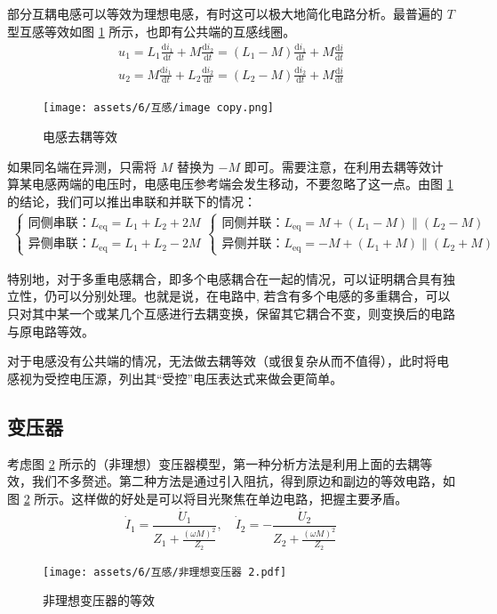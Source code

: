 \documentclass[UTF8]{report}
\theoremstyle{MyLineTheoremStyle} %
\theoremstyle{MyBlockTheoremStyle} %
\theoremstyle{MySubsubsectionStyle} %
\begin{document}
部分互耦电感可以等效为理想电感，有时这可以极大地简化电路分析。最普遍的 $T$ 型互感等效如图 \ref{电感去耦等效} 所示，也即有公共端的互感线圈。
\begin{gather}
u_1 = L_1 \frac{\mathrm{d} i_1}{\mathrm{d} t} + M \frac{\mathrm{d} i_2}{\mathrm{d} t} 
= (L_1 - M) \frac{\mathrm{d} i_1}{\mathrm{d} t} + M \frac{\mathrm{d} i}{\mathrm{d} t} \\ 
u_2 = M \frac{\mathrm{d} i_1}{\mathrm{d} t} + L_2 \frac{\mathrm{d} i_2}{\mathrm{d} t} 
= (L_2 - M) \frac{\mathrm{d} i_2}{\mathrm{d} t} + M \frac{\mathrm{d} i}{\mathrm{d} t}
\end{gather}
\begin{figure}[H]\centering
    \texttt{[image: assets/6/互感/image copy.png]}
    \caption{电感去耦等效}
    \label{电感去耦等效}
\end{figure}
如果同名端在异测，只需将 $M$ 替换为 $-M$ 即可。需要注意，在利用去耦等效计算某电感两端的电压时，电感电压参考端会发生移动，不要忽略了这一点。由图 \ref{电感去耦等效} 的结论，我们可以推出串联和并联下的情况：
\begin{gather}
\begin{cases}
\text{同侧串联：} L_{\text{eq}} = L_1 + L_2 + 2M \\
\text{异侧串联：} L_{\text{eq}} = L_1 + L_2 - 2M
\end{cases} 
\begin{cases}
\text{同侧并联：} L_{\text{eq}} = M + (L_1 - M)\parallel(L_2 - M)\\
\text{异侧并联：} L_{\text{eq}} = -M + (L_1 + M)\parallel(L_2 + M)
\end{cases}
\end{gather}

特别地，对于多重电感耦合，即多个电感耦合在一起的情况，可以证明耦合具有独立性，仍可以分别处理。也就是说，在电路中, 若含有多个电感的多重耦合，可以只对其中某一个或某几个互感进行去耦变换，保留其它耦合不变，则变换后的电路与原电路等效。

对于电感没有公共端的情况，无法做去耦等效（或很复杂从而不值得），此时将电感视为受控电压源，列出其“受控”电压表达式来做会更简单。

\subsection{变压器}

考虑图 \ref{非理想变压器等效} 所示的（非理想）变压器模型，第一种分析方法是利用上面的去耦等效，我们不多赘述。第二种方法是通过引入阻抗，得到原边和副边的等效电路，如图 \ref{非理想变压器等效} 所示。这样做的好处是可以将目光聚焦在单边电路，把握主要矛盾。
\begin{equation}
    \dot{I}_1 = \frac{\dot{U}_1}{Z_1 + \frac{(\omega M)^2}{Z_2}}, \quad \dot{I}_2 = - \frac{\dot{U}_2}{Z_2 + \frac{(\omega M)^2}{Z_2}}
\end{equation}
\begin{figure}[H]\centering
    \texttt{[image: assets/6/互感/非理想变压器 2.pdf]}
    \caption{非理想变压器的等效}
    \label{非理想变压器等效}
\end{figure}
\end{document}
